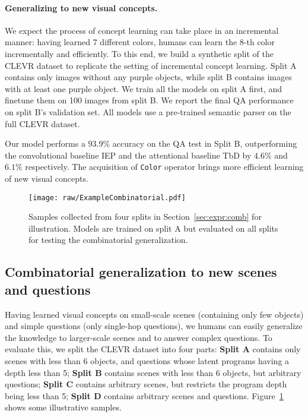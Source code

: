 \documentclass{article} \usepackage{iclr2019_conference,times}
\newcommand{\sect}[1]{Section~\ref{#1}}
\newcommand{\myparagraph}[1]{\vspace{-3pt}\paragraph{#1}}
\begin{document}
\myparagraph{Generalizing to new visual concepts.} We expect the process of concept learning can take place in an incremental manner: having learned 7 different colors, humans can learn the 8-th color incrementally and efficiently. To this end, we build a synthetic split of the CLEVR dataset to replicate the setting of incremental concept learning. Split A contains only images without any purple objects, while split B contains images with at least one purple object. We train all the models on split A first, and finetune them on 100 images from split B. We report the final QA performance on split B's validation set. All models use a pre-trained semantic parser on the full CLEVR dataset. 

Our model performs a $93.9\%$ accuracy on the QA test in Split B, outperforming the convolutional baseline IEP \citep{Johnson2017Inferring} and the attentional baseline TbD \citep{Mascharka2018Transparency} by $4.6\%$ and $6.1\%$ respectively. The acquisition of \texttt{Color} operator brings more efficient learning of new visual concepts.

\begin{figure}[t]
\centering
\texttt{[image: raw/ExampleCombinatorial.pdf]}
\vspace{-20pt}
\caption{Samples collected from four splits in \sect{sec:expr:comb} for illustration. Models are trained on split A but evaluated on all splits for testing the combinatorial generalization.}
\vspace{-5pt}
\label{fig:example-comb}
\end{figure}
 
\subsection{Combinatorial generalization to new scenes and questions}

Having learned visual concepts on small-scale scenes (containing only few objects) and simple questions (only single-hop questions), we humans can easily generalize the knowledge to larger-scale scenes and to answer complex questions. To evaluate this, we split the CLEVR dataset into four parts: \textbf{Split A} contains only scenes with less than 6 objects, and questions whose latent programs having a depth less than 5; \textbf{Split B} contains scenes with less than 6 objects, but arbitrary questions; \textbf{Split C} contains arbitrary scenes, but restricts the program depth being less than 5; \textbf{Split D} contains arbitrary scenes and questions. Figure~\ref{fig:example-comb} shows some illustrative samples.
\end{document}
